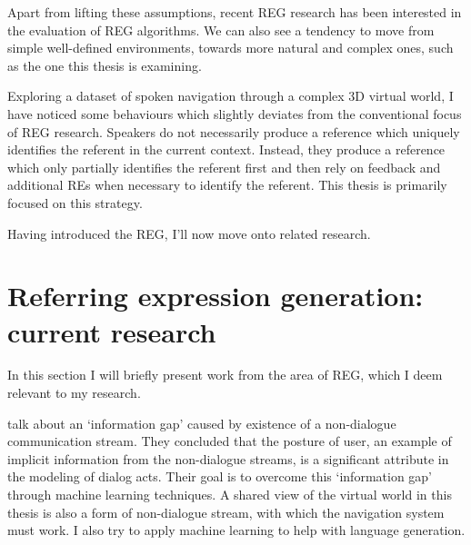 Apart from lifting these assumptions, recent REG research has been interested in the evaluation of REG algorithms. We can also see a tendency to move from simple well-defined environments, towards more natural and complex ones, such as the one this thesis is examining.

Exploring a dataset of spoken navigation through a complex 3D virtual world, I have noticed some behaviours which slightly deviates from the conventional focus of REG research. Speakers do not necessarily produce a reference which uniquely identifies the referent in the current context. Instead, they produce a reference which only partially identifies the referent first and then rely on feedback and additional REs when necessary to identify the referent. This thesis is primarily focused on this strategy.

Having introduced the REG, I'll now move onto related research.

\section{Referring expression generation: current research}
\label{sec:relwork}
In this section I will briefly present work from the area of REG, which I deem relevant to my research.

\citet{ha2012combining} talk about an `information gap' caused by existence of a non-dialogue communication stream. They concluded that the posture of user, an example of implicit information from the non-dialogue streams, is a significant attribute in the modeling of dialog acts. Their goal is to overcome this `information gap' through machine learning techniques. A shared view of the virtual world in this thesis is also a form of non-dialogue stream, with which the navigation system must work. I also try to apply machine learning to help with language generation.

